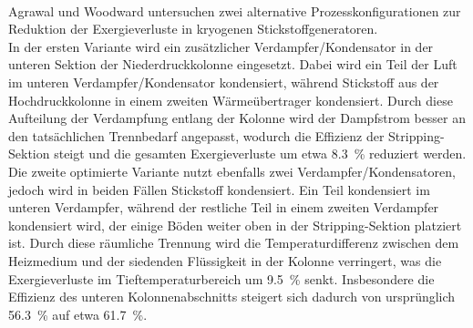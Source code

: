 \\
Agrawal und Woodward untersuchen zwei alternative Prozesskonfigurationen zur 
Reduktion der Exergieverluste in kryogenen Stickstoffgeneratoren.\\
In der ersten Variante wird ein zusätzlicher Verdampfer/Kondensator in der 
unteren Sektion der Niederdruckkolonne eingesetzt. Dabei wird ein Teil der Luft im unteren Verdampfer/Kondensator kondensiert, während Stickstoff aus der 
Hochdruckkolonne in einem zweiten Wärmeübertrager kondensiert. Durch diese 
Aufteilung der Verdampfung entlang der Kolonne wird der Dampfstrom besser an 
den tatsächlichen Trennbedarf angepasst, wodurch die Effizienz der 
Stripping-Sektion steigt und die gesamten Exergieverluste um etwa 
\SI{8.3}{\percent} reduziert werden.\\
Die zweite optimierte Variante nutzt ebenfalls zwei Verdampfer/Kondensatoren, 
jedoch wird in beiden Fällen Stickstoff kondensiert. Ein Teil kondensiert im 
unteren Verdampfer, während der restliche Teil in einem zweiten 
Verdampfer kondensiert wird, der einige Böden weiter oben in der 
Stripping-Sektion platziert ist. Durch diese räumliche Trennung wird die 
Temperaturdifferenz zwischen dem Heizmedium und der siedenden Flüssigkeit in 
der Kolonne verringert, was die Exergieverluste im Tieftemperaturbereich um 
\SI{9.5}{\percent} senkt. Insbesondere die Effizienz des unteren 
Kolonnenabschnitts steigert sich dadurch von ursprünglich 
\SI{56.3}{\percent} auf etwa \SI{61.7}{\percent}.